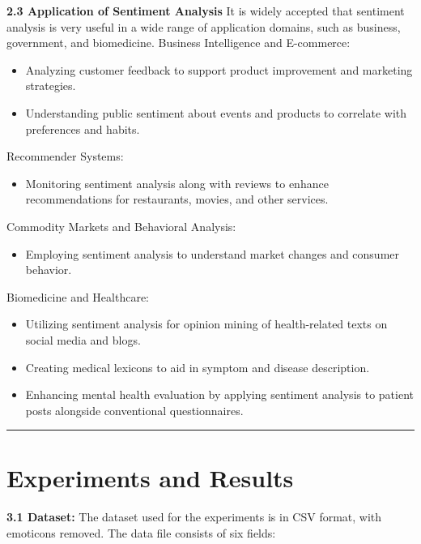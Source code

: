 \documentclass[a4paper]{article}
\theoremstyle{plain}
\theoremstyle{definition}
\begin{document}
\textbf{2.3 Application of Sentiment Analysis}
\newline
It is widely accepted that sentiment analysis is very useful in a wide range of application domains, such as business, government, and biomedicine.
\vspace{0.2 cm}\newline
{Business Intelligence and E-commerce:}
\begin{itemize}
    \item Analyzing customer feedback to support product improvement and marketing strategies.
    \item Understanding public sentiment about events and products to correlate with preferences and habits.
\end{itemize}
\newline
{Recommender Systems:}
\begin{itemize}
    \item Monitoring sentiment analysis along with reviews to enhance recommendations for restaurants, movies, and other services.
\end{itemize}
\newline
{Commodity Markets and Behavioral Analysis:}
\begin{itemize}
    \item Employing sentiment analysis to understand market changes and consumer behavior.
\end{itemize}
\newline
{Biomedicine and Healthcare:}
\begin{itemize}
    \item Utilizing sentiment analysis for opinion mining of health-related texts on social media and blogs.
    \item Creating medical lexicons to aid in symptom and disease description.
    \item Enhancing mental health evaluation by applying sentiment analysis to patient posts alongside conventional questionnaires.
\end{itemize}
\hrule{}
\section{Experiments and Results}
\label{sec:experiments}
\textbf{3.1 Dataset:\newline}
The dataset used for the experiments is in CSV format, with emoticons removed. The data file consists of six fields:
\end{document}
